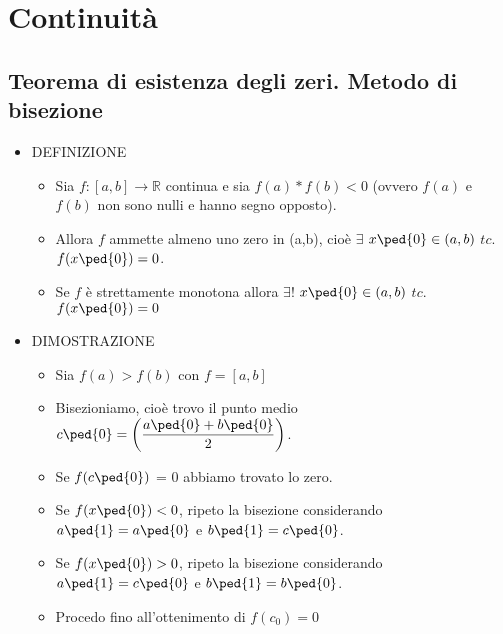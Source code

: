 \documentclass[10pt]{article}
\begin{document}
\section{Continuità}
\subsection{Teorema di esistenza degli zeri. Metodo di bisezione}
\begin{itemize}
\item
DEFINIZIONE
\begin{itemize}
\item
Sia $f:[a,b]\rightarrow \mathbb{R}$ continua e sia $f(a)*f(b)<0$ (ovvero $f(a)$ e $f(b)$ non sono nulli e hanno segno opposto). 
\item
Allora $f$ ammette almeno uno zero in (a,b), cioè $\exists$ $x\ped{0} \in (a,b)$ $tc.$ $f(x\ped{0}) =0$.
\item
Se $f$ è strettamente monotona allora $\exists!$ $x\ped{0} \in (a,b)$ $tc.$ $f(x\ped{0}) =0$
\end{itemize}
\medskip
\item
DIMOSTRAZIONE 
\begin{itemize}
\item 
Sia $f(a) > f(b)$ con $f=[a,b]$
\item
Bisezioniamo, cioè trovo il punto medio $\displaystyle {c\ped{0}= \left(\frac{a\ped{0}+b\ped{0}}{2}\right)}$.
\item
Se $f(c\ped{0})$ = 0 abbiamo trovato lo zero.
\item
Se $f(x\ped{0}) < 0$, ripeto la bisezione considerando $a\ped{1} = a\ped{0}$ e $b\ped{1} = c\ped{0}$.
\item
Se $f(x\ped{0}) > 0$, ripeto la bisezione considerando $a\ped{1} = c\ped{0}$ e $b\ped{1} = b\ped{0}$.
\item
Procedo fino all'ottenimento di $f(c_0)=0$
\end{itemize}
\medskip 
\end{itemize}
\end{document}
